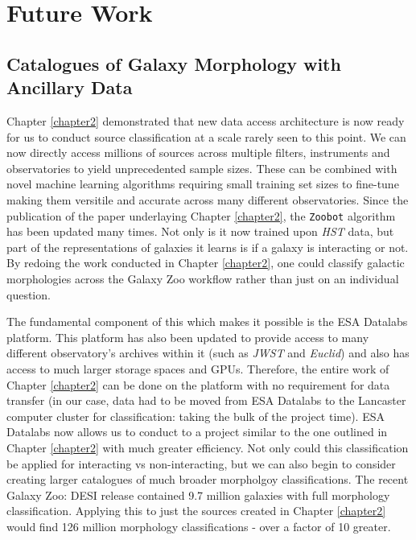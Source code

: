 \section{Future Work}
\subsection{Catalogues of Galaxy Morphology with Ancillary Data}
\noindent Chapter \ref{chapter2} demonstrated that new data access architecture is now ready for us to conduct source classification at a scale rarely seen to this point. We can now directly access millions of sources across multiple filters, instruments and observatories to yield unprecedented sample sizes. These can be combined with novel machine learning algorithms requiring small training set sizes to fine-tune making them versitile and accurate across many different observatories. Since the publication of the paper underlaying Chapter \ref{chapter2}, the \texttt{Zoobot} algorithm has been updated many times. Not only is it now trained upon \textit{HST} data, but part of the representations of galaxies it learns is if a galaxy is interacting or not. By redoing the work conducted in Chapter \ref{chapter2}, one could classify galactic morphologies across the Galaxy Zoo workflow rather than just on an individual question.

The fundamental component of this which makes it possible is the ESA Datalabs platform. This platform has also been updated to provide access to many different observatory's archives within it (such as \emph{JWST} and \emph{Euclid}) and also has access to much larger storage spaces and GPUs. Therefore, the entire work of Chapter \ref{chapter2} can be done on the platform with no requirement for data transfer (in our case, data had to be moved from ESA Datalabs to the Lancaster computer cluster for classification: taking the bulk of the project time). ESA Datalabs now allows us to conduct to a project similar to the one outlined in Chapter \ref{chapter2} with much greater efficiency. Not only could this classification be applied for interacting vs non-interacting, but we can also begin to consider creating larger catalogues of much broader morpholgoy classifications. The recent Galaxy Zoo: DESI release contained 9.7 million galaxies with full morphology classification. Applying this to just the sources created in Chapter \ref{chapter2} would find 126 million morphology classifications - over a factor of 10 greater.

